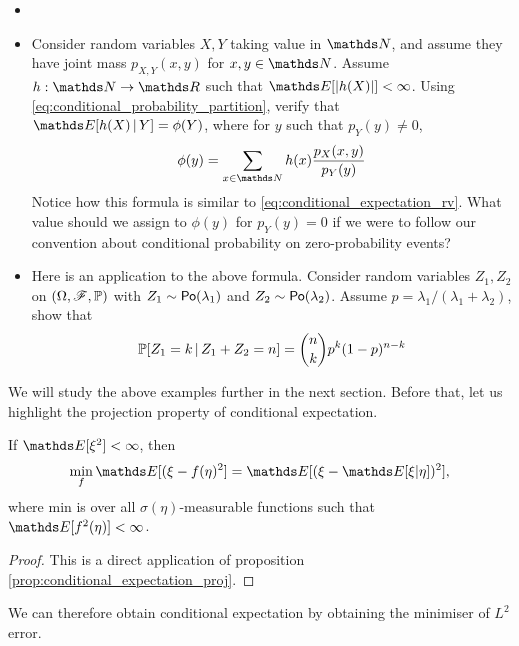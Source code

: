 \begin{exercise} \label{ex:conditional_expectation_discrete_rv}
\begin{itemize}
    \item[]
    \item Consider random variables $X,Y$ taking value in $\N$, and assume they have joint mass $p_{X,Y}(x,y)$ for $x,y \in \N$. Assume $h:\N \to \R$ such that $\E[|h(X)|] < \infty$. Using \eqref{eq:conditional_probability_partition}, verify that $\E[h(X)\,|\,Y] = \phi(Y)$, where for $y$ such that $p_Y(y) \neq 0$,
    \begin{equation}
        \phi(y) = \sum_{x\in\N} h(x) \frac{p_X(x,y)}{p_Y(y)}
    \end{equation}
    Notice how this formula is similar to \eqref{eq:conditional_expectation_rv}. What value should we assign to $\phi(y)$ for $p_Y(y) = 0$ if we were to follow our convention about conditional probability on zero-probability events?
    \item Here is an application to the above formula. Consider random variables $Z_1, Z_2$ on $(\Omega,\mathcal{F},\mathbb{P})$ with $Z_1 \sim \mathsf{Po}(\lambda_1)$ and $Z_2 \sim \mathsf{Po}(\lambda_2)$. Assume $p = \lambda_1/(\lambda_1+\lambda_2)$, show that
    \begin{equation}
        \mathbb{P}[Z_1 = k \,|\, Z_1 + Z_2 = n] = {n \choose k} p^k (1-p)^{n-k}
    \end{equation}
\end{itemize}
\end{exercise}

We will study the above examples further in the next section. Before that, let us highlight the projection property of conditional expectation.

\begin{proposition}
If $\E[\xi^2] < \infty$, then 
\begin{equation*}
    \min_f \E[(\xi - f(\eta)^2] = \E[(\xi - \E[\xi | \eta])^2],
\end{equation*}
where min is over all $\sigma(\eta)$-measurable functions such that $\E[f^2(\eta)] < \infty$.
\end{proposition}

\begin{proof}
This is a direct application of proposition \ref{prop:conditional_expectation_proj}.
\end{proof}

We can therefore obtain conditional expectation by obtaining the minimiser of $L^2$ error.

